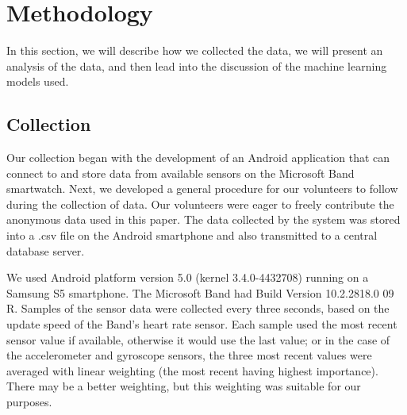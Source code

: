 \section{Methodology}

In this section, we will describe how we collected the data, we will present an analysis of the data, and then lead into the discussion of the machine learning models used.

\subsection{Collection}

Our collection began with the development of an Android application that can connect to and store data from available sensors on the Microsoft Band smartwatch. Next, we developed a general procedure for our volunteers to follow during the collection of data. Our volunteers were eager to freely contribute the anonymous data used in this paper. The data collected by the system was stored into a .csv file on the Android smartphone and also transmitted to a central database server.

We used Android platform version 5.0 (kernel 3.4.0-4432708) running on a Samsung S5 smartphone. The Microsoft Band had Build Version 10.2.2818.0 09 R. Samples of the sensor data were collected every three seconds, based on the update speed of the Band's heart rate sensor. Each sample used the most recent sensor value if available, otherwise it would use the last value; or in the case of the accelerometer and gyroscope sensors, the three most recent values were averaged with linear weighting (the most recent having highest importance). There may be a better weighting, but this weighting was suitable for our purposes.

